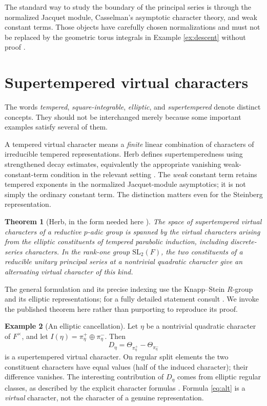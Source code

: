 \documentclass[12pt,letterpaper]{amsart}
\numberwithin{equation}{section}
\newtheorem{theorem}{Theorem}[section]
\theoremstyle{definition}
\newtheorem{example}[theorem]{Example}
\theoremstyle{remark}
\begin{document}
The standard way to study the boundary of the principal series is through the normalized Jacquet module, Casselman's asymptotic character theory, and weak constant terms. Those objects have carefully chosen normalizations and must not be replaced by the geometric torus integrals in Example \ref{ex:descent} without proof \cite{CaNotes,Si79}.

\section{Supertempered virtual characters}\label{sec:supertemp}
The words \emph{tempered}, \emph{square-integrable}, \emph{elliptic}, and \emph{supertempered} denote distinct concepts. They should not be interchanged merely because some important examples satisfy several of them.

A tempered virtual character means a \emph{finite} linear combination of characters of irreducible tempered representations.  Herb defines supertemperedness using strengthened decay estimates, equivalently the appropriate vanishing weak-constant-term condition in the relevant setting \cite{He94}. The \emph{weak} constant term retains tempered exponents in the normalized Jacquet-module asymptotics; it is not simply the ordinary constant term.  The distinction matters even for the Steinberg representation.

\begin{theorem}[Herb, in the form needed here \cite{He94}]\label{thm:herb}
The space of supertempered virtual characters of a reductive $p$-adic group is spanned by the virtual characters arising from the elliptic constituents of tempered parabolic induction, including discrete-series characters.  In the rank-one group $\mathrm{SL}_2(F)$, the two constituents of a reducible unitary principal series at a nontrivial quadratic character give an alternating virtual character of this kind.
\end{theorem}
The general formulation and its precise indexing use the Knapp--Stein $R$-group and its elliptic representations; for a fully detailed statement consult \cite{He94,Ar93}. We invoke the published theorem here rather than purporting to reproduce its proof.

\begin{example}[An elliptic cancellation]\label{ex:supertemp}
Let $\eta$ be a nontrivial quadratic character of $F^\times$, and let $I(\eta)=\pi_\eta^+\oplus\pi_\eta^-$. Then
\begin{equation}\label{eq:alt}
D_\eta=\Theta_{\pi_\eta^+}-\Theta_{\pi_\eta^-}
\end{equation}
is a supertempered virtual character. On regular split elements the two constituent characters have equal values (half of the induced character); their difference vanishes. The interesting contribution of $D_\eta$ comes from elliptic regular classes, as described by the explicit character formulas \cite{SS68,SS84}.  Formula \eqref{eq:alt} is a \emph{virtual} character, not the character of a genuine representation.
\end{example}
\end{document}
